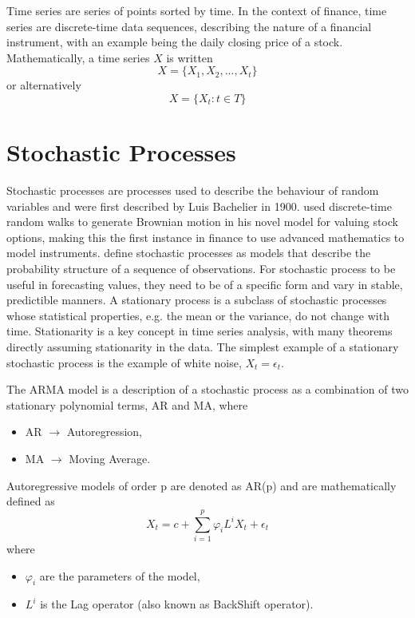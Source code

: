 Time series are series of points sorted by time. In the context of finance, time series are discrete-time data sequences, describing the nature of a financial instrument, with an example being the daily closing price of a stock. Mathematically, a time series $X$ is written
\begin{equation}
    X = \{X_1, X_2, ..., X_t\} 
\end{equation}
or alternatively
\begin{equation}
    X = \{X_t : t \in T\}
\end{equation}

\section{Stochastic Processes}
Stochastic processes are processes used to describe the behaviour of random variables and were first described by Luis Bachelier in 1900. \citeauthor{bachelier} used discrete-time random walks to generate Brownian motion in his novel model for valuing stock options, making this the first instance in finance to use advanced mathematics to model instruments. \citeauthor{box_jenkins} define stochastic processes as models that describe the probability structure of a sequence of observations. For stochastic process to be useful in forecasting values, they need to be of a specific form and vary in stable, predictible manners. A stationary process is a subclass of stochastic processes whose statistical properties, e.g. the mean or the variance, do not change with time. Stationarity is a key concept in time series analysis, with many theorems directly assuming stationarity in the data. The simplest example of a stationary stochastic process is the example of white noise, $X_t = \epsilon_t$.

The ARMA model is a description of a stochastic process as a combination of two stationary polynomial terms, AR and MA, 
where

\begin{itemize}[nosep]
    \item[] AR $\rightarrow$ Autoregression,
    \item[] MA $\rightarrow$ Moving Average.
\end{itemize}

Autoregressive models of order p are denoted as AR(p) and are mathematically defined as
\begin{equation}
    X_t = c + \sum\limits_{i=1}^{p} \varphi_i L^i X_t + \epsilon_t
\end{equation}
where
\begin{itemize}[nosep]
    \item[] $\varphi_i$ are the parameters of the model,
    \item[] $L^i$ is the Lag operator (also known as BackShift operator).
\end{itemize}

